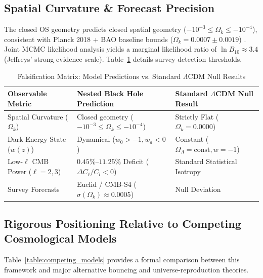 \documentclass[11pt,a4paper]{article}
\begin{document}
\subsection{Spatial Curvature \& Forecast Precision}\label{sec:curvature_forecast}
The closed OS geometry predicts closed spatial geometry ($-10^{-3} \le \Omega_k \le -10^{-4}$), consistent with Planck 2018 + BAO baseline bounds ($\Omega_k = 0.0007 \pm 0.0019$) \cite{planck2018}. Joint MCMC likelihood analysis yields a marginal likelihood ratio of $\ln B_{10} \approx 3.4$ (Jeffreys' strong evidence scale). Table~\ref{table:falsification} details survey detection thresholds.

\begin{table}[H]
\centering
\caption{Falsification Matrix: Model Predictions vs. Standard $\Lambda$CDM Null Results}\label{table:falsification}
\begin{tabular}{p{3.6cm}p{5.8cm}p{5.0cm}}
\toprule
\textbf{Observable Metric} & \textbf{Nested Black Hole Prediction} & \textbf{Standard $\Lambda$CDM Null Result} \\
\midrule
Spatial Curvature ($\Omega_k$) & Closed geometry ($-10^{-3} \le \Omega_k \le -10^{-4}$) & Strictly Flat ($\Omega_k = 0.0000$) \\
Dark Energy State ($w(z)$) & Dynamical ($w_0 > -1, w_a < 0$) & Constant ($\Omega_\Lambda = \text{const}, w = -1$) \\
Low-$\ell$ CMB Power ($\ell = 2, 3$) & $0.45\%\text{--}11.25\%$ Deficit ($\Delta C_\ell / C_l < 0$) & Standard Statistical Isotropy \\
Survey Forecasts & Euclid / CMB-S4 ($\sigma(\Omega_k) \approx 0.0005$) & Null Deviation \\
\bottomrule
\end{tabular}
\end{table}

\subsection{Rigorous Positioning Relative to Competing Cosmological Models}\label{sec:model_comparison}
Table~\ref{table:competing_models} provides a formal comparison between this framework and major alternative bouncing and universe-reproduction theories.
\end{document}
